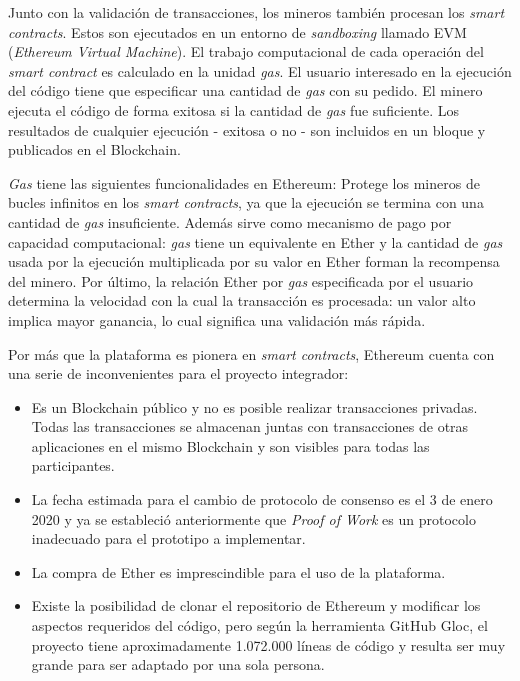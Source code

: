 Junto con la validación de transacciones, los mineros también procesan los \textit{smart contracts}. Estos son ejecutados en un entorno de \textit{sandboxing} llamado EVM (\textit{Ethereum Virtual Machine}). El trabajo computacional de cada operación del \textit{smart contract} es calculado en la unidad \textit{gas}. El usuario interesado en la ejecución del código tiene que especificar una cantidad de \textit{gas} con su pedido. El minero ejecuta el código de forma exitosa si la cantidad de \textit{gas} fue suficiente. Los resultados de cualquier ejecución - exitosa o no - son incluidos en un bloque y publicados en el Blockchain.

\textit{Gas} tiene las siguientes funcionalidades en Ethereum: Protege los mineros de bucles infinitos en los \textit{smart contracts}, ya que la ejecución se termina con una cantidad de \textit{gas} insuficiente. Además sirve como mecanismo de pago por capacidad computacional: \textit{gas} tiene un equivalente en Ether y la cantidad de \textit{gas} usada por la ejecución multiplicada por su valor en Ether forman la recompensa del minero. Por último, la relación Ether por \textit{gas} especificada por el usuario determina la velocidad con la cual la transacción es procesada: un valor alto implica mayor ganancia, lo cual significa una validación más rápida.

Por más que la plataforma es pionera en \textit{smart contracts}, Ethereum cuenta con una serie de inconvenientes para el proyecto integrador:

\begin{itemize}
\item Es un Blockchain público y no es posible realizar 	transacciones privadas. Todas las transacciones se almacenan juntas 	con transacciones de otras aplicaciones en el mismo Blockchain y son 	visibles para todas las participantes.
\item La fecha estimada para el cambio de protocolo de consenso es el 3 de enero 2020\cite{eth2-0} y ya se estableció anteriormente que \textit{Proof of Work} es un protocolo inadecuado para el prototipo a implementar.
\item La compra de Ether es imprescindible para el uso de la plataforma.
\item Existe la posibilidad de clonar el repositorio de Ethereum y modificar los aspectos requeridos del código, pero según la herramienta GitHub Gloc, el proyecto tiene aproximadamente 1.072.000 líneas de código y resulta ser muy grande para ser adaptado por una sola persona.
\end{itemize}

